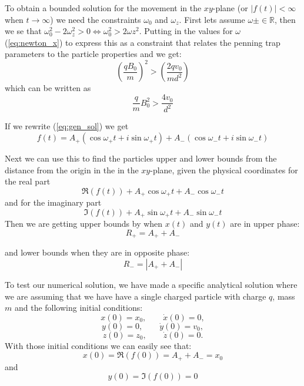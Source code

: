 \documentclass[english,notitlepage,reprint,nofootinbib]{revtex4-1}  %
\begin{document}
	To obtain a bounded solution for the movement in the $xy$-plane (or $|f(t)| < \infty$ when $t\to\infty$) we need the constraints $\omega_0$ and $\omega_z$. First lets assume $\omega \pm \in \mathbb{R}$, then we se that
	$\omega_0^2 - 2 \omega_z^2 > 0 \Leftrightarrow \omega_0^2 > 2 \omega z^2$.
	Putting in the values for $\omega$ (\ref{eq:newton_x}) to express this as a constraint that relates the penning trap parameters to the particle properties and we get:
	\begin{equation*}
		\left( \frac{q B_0}{m} \right) ^2 > \left( \frac{2 q v_0}{m d^2} \right)
	\end{equation*}
	which can be written as
	\begin{equation*}
		\frac{q}{m} B_0^2 > \frac{4 v_0}{d^2} 
	\end{equation*}
	
	If we rewrite (\ref{eq:gen_sol}) we get
	\begin{equation*}
		f(t) = A_+ (\cos \omega_+ t + i \sin \omega_+ t) + A_- (\cos \omega_- t + i \sin \omega_- t)
	\end{equation*}
	
	Next we can use this to find the particles upper and lower bounds from the distance from the origin in the in the $xy$-plane, given the physical coordinates for the real part
	\begin{equation*} 
		\Re \left( f(t) \right) + A_+ \cos \omega_+ t + A_- \cos \omega_- t
	\end{equation*}
	and for the imaginary part
	\begin{equation*}
		\Im \left( f(t) \right) + A_+ \sin \omega_+ t + A_- \sin \omega_- t
	\end{equation*}
	Then we are getting upper bounds by when $x(t)$ and $y(t)$ are in upper phase:
	\begin{equation*}
		R_+ = A_+ + A_-
	\end{equation*}
	
	and lower bounds when they are in opposite phase:
	\begin{equation*}
		R_- = | A_+ + A_- |
	\end{equation*}
	
	To test our numerical solution, we have made a specific analytical solution where we are assuming that we have have a single charged particle with charge $q$, mass $m$ and the following initial conditions:
	$$ x(0) = x_0, \qquad \dot{x}(0) = 0, $$
	$$ y(0) = 0, \qquad \dot{y}(0) = v_0, $$
	$$ z(0) = z_0, \qquad \dot{z}(0) = 0. $$
	With those initial conditions we can easily see that:
	\begin{equation*}
		x(0) = \Re \left( f(0) \right) = A_+ + A_- = x_0
	\end{equation*}
	and
	\begin{equation*}
		y(0) = \Im \left( f(0) \right) = 0
	\end{equation*}
	
\end{document}
